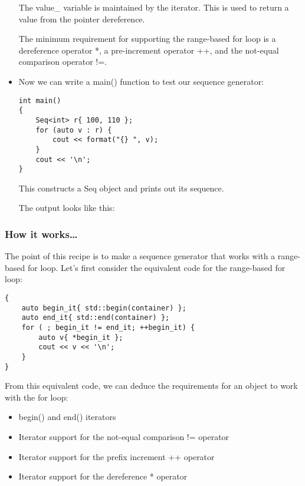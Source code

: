 \begin{itemize}
The value\_ variable is maintained by the iterator. This is used to return a value from the pointer dereference.

The minimum requirement for supporting the range-based for loop is a dereference operator *, a pre-increment operator ++, and the not-equal comparison operator !=.

\item 
Now we can write a main() function to test our sequence generator:

\begin{lstlisting}[style=styleCXX]
int main()
{
	Seq<int> r{ 100, 110 };
	for (auto v : r) {
		cout << format("{} ", v);
	}
	cout << '\n';
}
\end{lstlisting}

This constructs a Seq object and prints out its sequence.

The output looks like this:


\end{itemize}

\subsubsection{How it works…}

The point of this recipe is to make a sequence generator that works with a range-based for loop. Let's first consider the equivalent code for the range-based for loop:

\begin{lstlisting}[style=styleCXX]
{
	auto begin_it{ std::begin(container) };
	auto end_it{ std::end(container) };
	for ( ; begin_it != end_it; ++begin_it) {
		auto v{ *begin_it };
		cout << v << '\n';
	}
}
\end{lstlisting}

From this equivalent code, we can deduce the requirements for an object to work with the for loop:

\begin{itemize}
\item 
begin() and end() iterators

\item 
Iterator support for the not-equal comparison != operator

\item 
Iterator support for the prefix increment ++ operator

\item 
Iterator support for the dereference * operator
\end{itemize}

